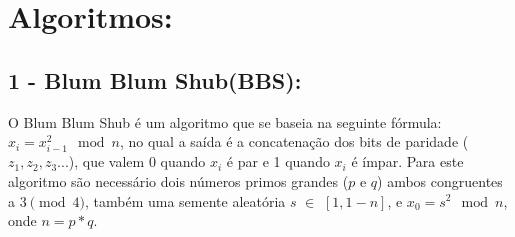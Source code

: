 \documentclass[
    article,            %
    11pt,               %
    oneside,            %
    a4paper,            %
    english,            %
    brazil,             %
    sumario=tradicional,
    ]{abntex2}
\begin{document}

\frenchspacing 


%
%

\maketitle


\textual


\section*{\textbf{Algoritmos:}}

\subsection*{\textbf{1 - Blum Blum Shub(BBS):}}

O Blum Blum Shub é um algoritmo que se baseia na seguinte fórmula: $x_i = x_{i-1}^2 \mod n$, no qual a saída é a concatenação dos bits de paridade ($z_1,z_2,z_3...$), que valem 0 quando $x_i$ é par e 1 quando $x_i$ é ímpar. Para este algoritmo são necessário dois números primos grandes ($p$ e $q$) ambos congruentes a $3\pmod4$, também uma semente aleatória $s$ $\in$ $[1,1-n]$, e $x_0 = s^2\mod n$, onde $n = p * q$.
\end{document}
